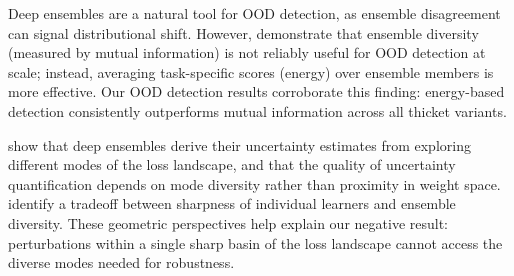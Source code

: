 Deep ensembles are a natural tool for OOD detection, as ensemble disagreement can signal distributional shift. However, \citet{xia2022usefulness} demonstrate that ensemble diversity (measured by mutual information) is not reliably useful for OOD detection at scale; instead, averaging task-specific scores (\eg energy) over ensemble members is more effective. Our OOD detection results corroborate this finding: energy-based detection consistently outperforms mutual information across all thicket variants.

\citet{fort2019deep} show that deep ensembles derive their uncertainty estimates from exploring different modes of the loss landscape, and that the quality of uncertainty quantification depends on mode diversity rather than proximity in weight space. \citet{lu2024sharpbalance} identify a tradeoff between sharpness of individual learners and ensemble diversity. These geometric perspectives help explain our negative result: perturbations within a single sharp basin of the loss landscape cannot access the diverse modes needed for robustness.
